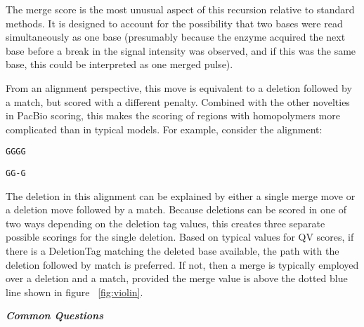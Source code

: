 \documentclass[paper=a4, fontsize=11pt]{scrartcl}
\numberwithin{equation}{section}		%
\numberwithin{figure}{section}			%
\numberwithin{table}{section}				%
\begin{document}
The merge score is the most unusual aspect of this recursion relative to standard methods.  It is designed to account for the possibility that two bases were read simultaneously as one base (presumably because the enzyme acquired the next base before a break in the signal intensity was observed, and if this was the same base, this could be interpreted as one merged pulse).

From an alignment perspective, this move is equivalent to a deletion followed by a match, but scored with a different penalty.  Combined with the other novelties in PacBio scoring, this makes the scoring of regions with homopolymers more complicated than in typical models.  For example, consider the alignment:
\begin{center}
\texttt{GGGG}

\texttt{GG-G}
\end{center}

The deletion in this alignment can be explained by either a single merge move or a deletion move followed by a match.  Because deletions can be scored in one of two ways depending on the deletion tag values, this creates three separate possible scorings for the single deletion.  Based on typical values for QV scores, if there is a DeletionTag matching the deleted base available, the path with the deletion followed by match is preferred.  If not, then a merge is typically employed over a deletion and a match, provided the merge value is above the dotted blue line shown in figure ~\ref{fig:violin}.

\newpage

\setlength\cftbeforefaqtitleskip{4em} %
\setlength\cftafterfaqtitleskip{1em} %
\setlength\cftparskip{.3em} %


\begin{center}
\Huge{\bf \emph{Common Questions}} %
\end{center}
\listofquestions %
\end{document}
